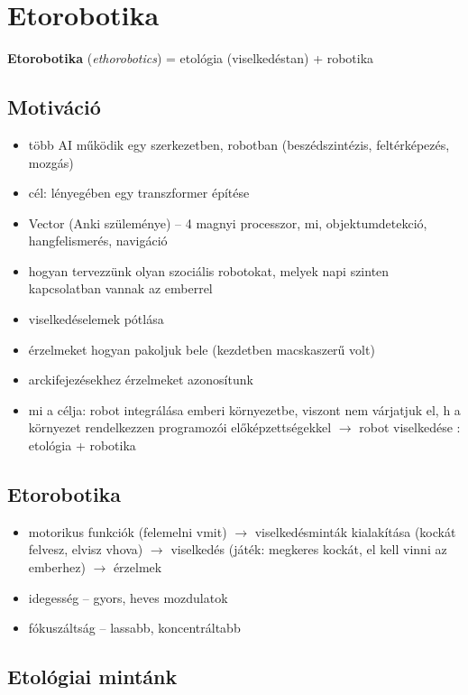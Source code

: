 \documentclass[a4paper, 11pt]{article}
\begin{document}
\newpage

\section{Etorobotika}

\textbf{Etorobotika} (\textit{ethorobotics}) = etológia (viselkedéstan) + robotika

\subsection{Motiváció}

\begin{itemize}
	\item több AI működik egy szerkezetben, robotban (beszédszintézis, feltérképezés, mozgás)
	\item cél: lényegében egy transzformer építése
	\item Vector (Anki szüleménye) -- 4 magnyi processzor, mi, objektumdetekció, hangfelismerés, navigáció
	\item hogyan tervezzünk olyan szociális robotokat, melyek napi szinten kapcsolatban vannak az emberrel
	\item viselkedéselemek pótlása
	\item érzelmeket hogyan pakoljuk bele (kezdetben macskaszerű volt)
	\item arckifejezésekhez érzelmeket azonosítunk
	\item mi a célja: robot integrálása emberi környezetbe, viszont nem várjatjuk el, h a környezet rendelkezzen programozói előképzettségekkel $\to$ robot viselkedése : etológia + robotika
\end{itemize}

\subsection{Etorobotika}

\begin{itemize}
	\item motorikus funkciók (felemelni vmit) $\to$ viselkedésminták kialakítása (kockát felvesz, elvisz vhova) $\to$ viselkedés (játék: megkeres kockát, el kell vinni az emberhez) $\to$ érzelmek
	\item idegesség -- gyors, heves mozdulatok
	\item fókuszáltság -- lassabb, koncentráltabb
\end{itemize}

\subsection{Etológiai mintánk}
\end{document}
